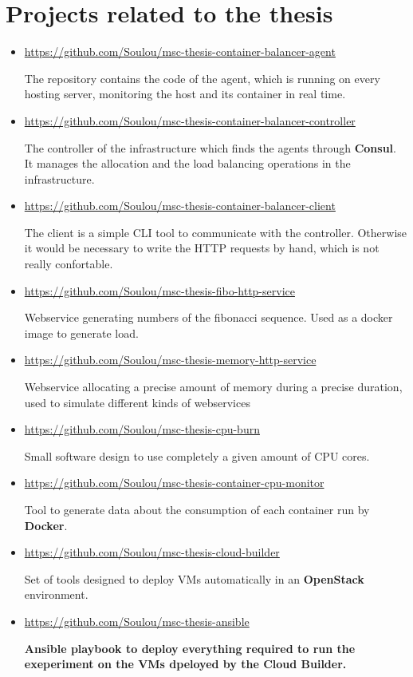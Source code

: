\chapter{Projects related to the thesis}
\label{app:rel-projects}

\begin{itemize}
\item{\url{https://github.com/Soulou/msc-thesis-container-balancer-agent}

The repository contains the code of the agent, which is running on every
hosting server, monitoring the host and its container in real time.}

\item{\url{https://github.com/Soulou/msc-thesis-container-balancer-controller}

The controller of the infrastructure which finds the agents through
\textbf{Consul}. It manages the allocation and the load balancing operations in
the infrastructure.}

\item{\url{https://github.com/Soulou/msc-thesis-container-balancer-client}

The client is a simple CLI tool to communicate with the controller. Otherwise
it would be necessary to write the HTTP requests by hand, which is not really
confortable.}

\item{\url{https://github.com/Soulou/msc-thesis-fibo-http-service}

Webservice generating numbers of the fibonacci sequence. Used as a docker image
to generate load.}

\item{\url{https://github.com/Soulou/msc-thesis-memory-http-service}

Webservice allocating a precise amount of memory during a precise duration,
used to simulate different kinds of webservices}

\item{\url{https://github.com/Soulou/msc-thesis-cpu-burn}

Small software design to use completely a given amount of CPU cores.}

\item{\url{https://github.com/Soulou/msc-thesis-container-cpu-monitor}

Tool to generate data about the consumption of each container run by
\textbf{Docker}.}

\item{\url{https://github.com/Soulou/msc-thesis-cloud-builder}

Set of tools designed to deploy VMs automatically in an \textbf{OpenStack}
environment.}

\item{\url{https://github.com/Soulou/msc-thesis-ansible}

\textbf{Ansible playbook to deploy everything required to run the exeperiment
on the VMs dpeloyed by the Cloud Builder.}}
\end{itemize}
